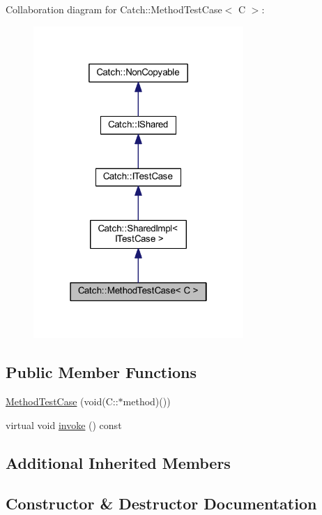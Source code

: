 Collaboration diagram for Catch\+:\+:Method\+Test\+Case$<$ C $>$\+:\nopagebreak
\begin{figure}[H]
\begin{center}
\leavevmode
\includegraphics[width=226pt]{class_catch_1_1_method_test_case__coll__graph}
\end{center}
\end{figure}
\subsection*{Public Member Functions}
\begin{DoxyCompactItemize}
\item 
\hyperlink{class_catch_1_1_method_test_case_a7b043b85dae371358255dd9dc6582e7b}{Method\+Test\+Case} (void(C\+::$\ast$method)())
\item 
virtual void \hyperlink{class_catch_1_1_method_test_case_a4e2263cfa0646f2980768328cb372793}{invoke} () const
\end{DoxyCompactItemize}
\subsection*{Additional Inherited Members}


\subsection{Constructor \& Destructor Documentation}
\hypertarget{class_catch_1_1_method_test_case_a7b043b85dae371358255dd9dc6582e7b}{}\label{class_catch_1_1_method_test_case_a7b043b85dae371358255dd9dc6582e7b} 
